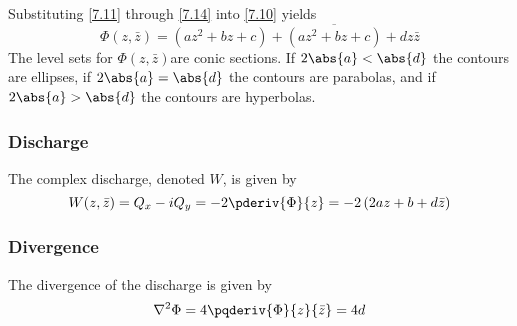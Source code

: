 \documentclass[12pt]{article}
\begin{document}
%
Substituting \eqref{7.11} through \eqref{7.14} into \eqref{7.10} yields
%
\begin{equation}\label{7.15}
\boxed{
    \Phi(z,\bar{z}) = \left( az^2 + bz + c \right) + \overline{\left(az^2 + bz + c\right)} + dz\bar{z}
}
\end{equation}
%
The level sets for $\Phi(z,\bar{z})$are conic sections. If $2 \abs{a} < \abs{d}$ the contours are ellipses, if $2\abs{a} = \abs{d}$ the contours are parabolas, and if $2\abs{a} > \abs{d}$ the contours are hyperbolas.

\subsubsection{Discharge}
The complex discharge, denoted $W$, is given by
%
\begin{equation}\label{7.16}
    W(z,\bar{z}) = Q_x - i Q_y = -2 \pderiv{\Phi}{z} = -2 \left( 2az + b + d\bar{z} \right)
\end{equation}

\subsubsection{Divergence}
The divergence of the discharge is given by
%
\begin{equation}\label{7.17}
    \nabla^2 \Phi = 4 \pqderiv{\Phi}{z}{\bar{z}} = 4d
\end{equation}


\end{document}
